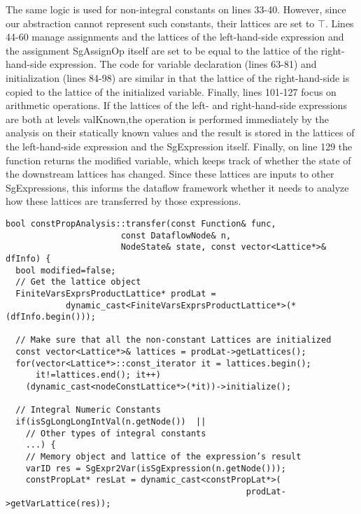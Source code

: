 { The same logic is used for non-integral constants on lines 33-40. However, since our abstraction cannot represent such constants, their lattices are set to $\top$. Lines 44-60 manage assignments and the lattices of the left-hand-side expression and the assignment {\scriptsize SgAssignOp} itself are set to be equal to the lattice of the right-hand-side expression. The code for variable declaration (lines 63-81) and initialization (lines 84-98) are similar in that the lattice of the right-hand-side is copied to the lattice of the initialized variable. Finally, lines 101-127 focus on arithmetic operations. If the lattices of the left- and right-hand-side expressions are both at levels {\scriptsize valKnown},the operation is performed immediately by the analysis on their statically known values and the result is stored in the lattices of the left-hand-side expression and the {\scriptsize SgExpression} itself. Finally, on line 129 the function returns the {\scriptsize modified} variable, which keeps track of whether the state of the downstream lattices has changed. Since these lattices are inputs to other {\scriptsize SgExpressions}, this informs the dataflow framework whether it needs to analyze how these lattices are transferred by those expressions.   


\begin{frame}
\centering
\begin{lstlisting}
bool constPropAnalysis::transfer(const Function& func, 
                       const DataflowNode& n, 
                       NodeState& state, const vector<Lattice*>& dfInfo) {
  bool modified=false;
  // Get the lattice object
  FiniteVarsExprsProductLattice* prodLat = 
            dynamic_cast<FiniteVarsExprsProductLattice*>(*(dfInfo.begin()));

  // Make sure that all the non-constant Lattices are initialized
  const vector<Lattice*>& lattices = prodLat->getLattices();
  for(vector<Lattice*>::const_iterator it = lattices.begin(); 
      it!=lattices.end(); it++)
    (dynamic_cast<nodeConstLattice*>(*it))->initialize();

  // Integral Numeric Constants
  if(isSgLongLongIntVal(n.getNode())  || 
    // Other types of integral constants 
    ...) {
    // Memory object and lattice of the expression’s result
    varID res = SgExpr2Var(isSgExpression(n.getNode()));
    constPropLat* resLat = dynamic_cast<constPropLat*>(
                                                prodLat->getVarLattice(res));


\end{lstlisting}
\end{frame}}
